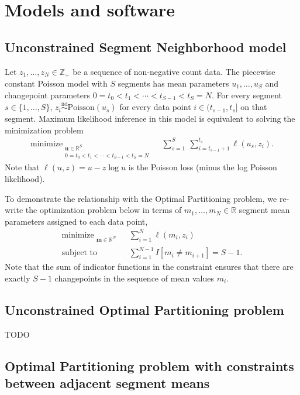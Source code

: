 \documentclass[article]{jss}
\DeclareMathOperator*{\minimize}{minimize}
\newcommand{\ZZ}{\mathbb Z}
\newcommand{\RR}{\mathbb R}
\begin{document}
\section{Models and software} \label{sec:models}

\subsection{Unconstrained Segment Neighborhood model}

Let $z_1,\dots,z_N\in\ZZ_+$ be a sequence of non-negative count
data. The piecewise constant Poisson model with $S$ segments has mean
parameters $u_1,\dots,u_S$ and changepoint parameters
$0=t_0<t_1<\cdots<t_{S-1}<t_S=N$. For every segment
$s\in\{1,\dots,S\}$,
$z_i \stackrel{\text{iid}}{\sim} \text{Poisson}(u_s)$ for every data
point $i\in(t_{s-1},t_s]$ on that segment. Maximum likelihood
inference in this model is equivalent to solving the minimization
problem
\begin{align}
    \minimize_{\substack{
  \mathbf u\in\RR^{S}
\\
   0=t_0<t_1<\cdots<t_{S-1}<t_S=N
  }} &\ \ 
    \sum_{s=1}^S\  \sum_{i=t_{s-1}+1}^{t_s} \ell(u_s,z_i).
\end{align}
Note that $\ell(u, z)=u-z\log u$ is the Poisson loss (minus the log
Poisson likelihood).

To demonstrate the relationship with the Optimal Partitioning problem,
we re-write the optimization problem below in terms of $m_1,\dots,m_N\in\RR$
segment mean parameters assigned to each data point,
\begin{align}
    \minimize_{\substack{
  \mathbf m\in\RR^{N}
  }} &\ \ 
    \sum_{i=1}^N \ell(m_i, z_i)
\\
      \text{subject to} &\ \ \sum_{i=1}^{N-1} I[m_i\neq m_{i+1}]=S-1.
  \nonumber
\end{align}
Note that the sum of indicator functions in the constraint ensures
that there are exactly $S-1$ changepoints in the sequence of mean
values $m_i$.

\subsection{Unconstrained Optimal Partitioning problem}

TODO

\subsection{Optimal Partitioning problem with constraints between adjacent segment means}
\end{document}
